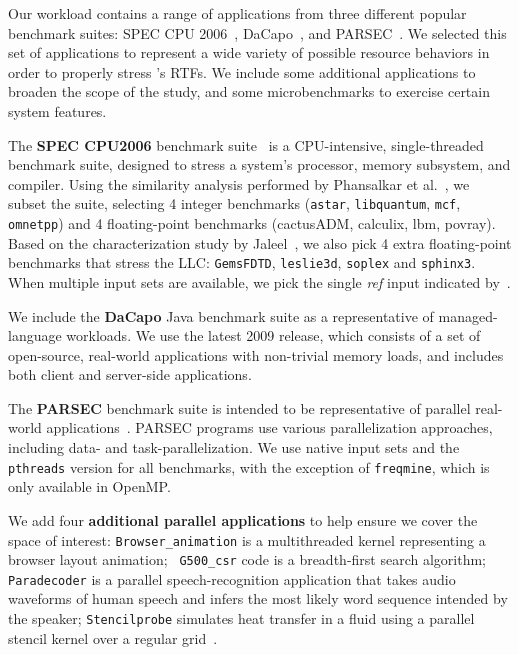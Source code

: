Our workload contains a range of applications from three different
popular benchmark suites: SPEC CPU 2006~\cite{SPEC2006},
DaCapo~\cite{dacapo}, and PARSEC~\cite{parsec}. We selected this set of applications to represent a wide variety of possible resource behaviors in order to properly stress \pacora's RTFs. We include some additional applications to broaden the
scope of the study, and some microbenchmarks to exercise certain
system features.

The \textbf{SPEC CPU2006} benchmark suite~\cite{SPEC2006} is a
CPU-intensive, single-threaded benchmark suite, designed to stress a
system's processor, memory subsystem, and compiler.  Using the
similarity analysis performed by Phansalkar et
al.~\cite{Phansalkar:ISCA2007}, we subset the suite, selecting 4
integer benchmarks ({\tt astar}, {\tt libquantum}, {\tt mcf}, {\tt omnetpp}) and 4
floating-point benchmarks (cactusADM, calculix, lbm, povray).  Based
on the characterization study by Jaleel~\cite{Jaleel:TR2007}, we also
pick 4 extra floating-point benchmarks that stress the LLC: {\tt GemsFDTD},
{\tt leslie3d}, {\tt soplex} and {\tt sphinx3}.  When multiple input sets are
available, we pick the single \textit{ref} input indicated by~\cite{Phansalkar:ISCA2007}.

We include the \textbf{DaCapo} Java benchmark suite as a
representative of managed-language workloads. We use the latest 2009 release, which consists of a set of open-source, real-world
applications with non-trivial memory loads, and includes both client and
server-side applications.

The \textbf{PARSEC} benchmark suite is intended to be representative
of parallel real-world applications~\cite{parsec}. PARSEC
programs use various parallelization approaches, including data- and
task-parallelization. We use native input sets and the {\tt pthreads} version for all benchmarks, with the exception of
\texttt{freqmine}, which is only available in OpenMP.

We add four \textbf{additional parallel applications} to help ensure
we cover the space of interest: {\tt Browser\_animation} is a
multithreaded kernel representing a browser layout animation; {\tt
  G500\_csr} code is a breadth-first search algorithm; {\tt Paradecoder} is a parallel
speech-recognition application that takes audio waveforms of human
speech and infers the most likely word sequence intended by the
speaker; {\tt Stencilprobe} simulates heat transfer in a fluid
using a parallel stencil kernel over a regular
grid~\cite{Kamil:Stencilprobe}.

